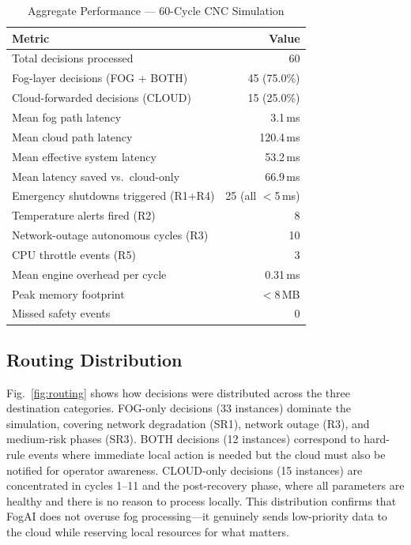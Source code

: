 \documentclass[conference]{IEEEtran}
\begin{document}
\begin{table}[t]
\caption{Aggregate Performance --- 60-Cycle CNC Simulation}
\label{tab:results}
\centering
\small
\begin{tabular}{@{}lr@{}}
\toprule
\textbf{Metric} & \textbf{Value} \\
\midrule
Total decisions processed              & 60      \\
Fog-layer decisions (FOG $+$ BOTH)    & 45 \;(75.0\%) \\
Cloud-forwarded decisions (CLOUD)      & 15 \;(25.0\%) \\
Mean fog path latency                  & 3.1\,ms \\
Mean cloud path latency                & 120.4\,ms \\
Mean effective system latency          & 53.2\,ms \\
Mean latency saved vs.\ cloud-only     & 66.9\,ms \\
\midrule
Emergency shutdowns triggered (R1+R4)  & 25 \;(all $<$5\,ms) \\
Temperature alerts fired (R2)          & 8       \\
Network-outage autonomous cycles (R3)  & 10      \\
CPU throttle events (R5)               & 3       \\
\midrule
Mean engine overhead per cycle         & 0.31\,ms \\
Peak memory footprint                  & $<$8\,MB \\
Missed safety events                   & 0       \\
\bottomrule
\end{tabular}
\end{table}

\subsection{Routing Distribution}

Fig.~\ref{fig:routing} shows how decisions were distributed across
the three destination categories.
FOG-only decisions (33 instances) dominate the simulation, covering
network degradation (SR1), network outage (R3), and medium-risk phases
(SR3).
BOTH decisions (12 instances) correspond to hard-rule events where
immediate local action is needed but the cloud must also be notified
for operator awareness.
CLOUD-only decisions (15 instances) are concentrated in cycles 1--11
and the post-recovery phase, where all parameters are healthy and there
is no reason to process locally.
This distribution confirms that FogAI does not overuse fog
processing---it genuinely sends low-priority data to the cloud while
reserving local resources for what matters.
\end{document}
